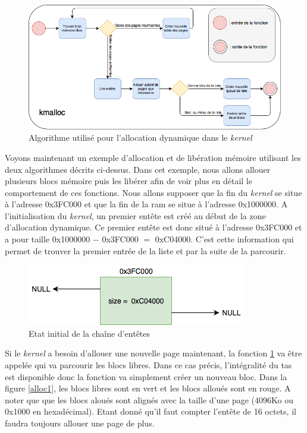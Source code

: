 \begin{figure}[!h]
  \centering
  \includegraphics[scale=0.6]{images/kmalloc.png}
  \caption{Algorithme utilisé pour l'allocation dynamique dans le \textit{kernel}}
  \label{kmalloc}
\end{figure}

Voyons maintenant un exemple d'allocation et de libération mémoire utilisant les
deux algorithmes décrits ci-dessus. Dans cet exemple, nous allons allouer plusieurs
blocs mémoire puis les libérer afin de voir plus en détail le comportement
de ces fonctions. Nous allons supposer que la fin du \textit{kernel} se situe
à l'adresse 0x3FC000 et que la fin de la \acrshort{ram} se situe à l'adresse
0x1000000. A l'initialisation du \textit{kernel}, un premier entête est créé au
début de la zone d'allocation dynamique. Ce premier entête est donc situé à
l'adresse 0x3FC000 et a pour taille 0x1000000 $-$ 0x3FC000 $=$ 0xC04000. C'est cette
information qui permet de trouver la premier entrée de la liste et par la suite
de la parcourir.

\begin{figure}[!h]
  \centering
  \includegraphics[scale=0.7]{images/alloc0.png}
  \caption{Etat initial de la chaîne d'entêtes}
  \label{alloc0}
\end{figure}

Si le \textit{kernel} a besoin d'allouer une nouvelle page maintenant, la fonction
\ref{kmalloc} va être appelée qui va parcourir les blocs libres. Dans ce cas précis,
l'intégralité du tas est disponible donc la fonction va simplement créer un nouveau
bloc. Dans la figure \ref{alloc1}, les blocs libres sont en vert et les blocs alloués
sont en rouge. A noter que que les blocs aloués sont alignés avec la taille d'une
page (4096Ko ou 0x1000 en hexadécimal). Etant donné qu'il faut compter l'entête
de 16 octets, il faudra toujours allouer une page de plus.

